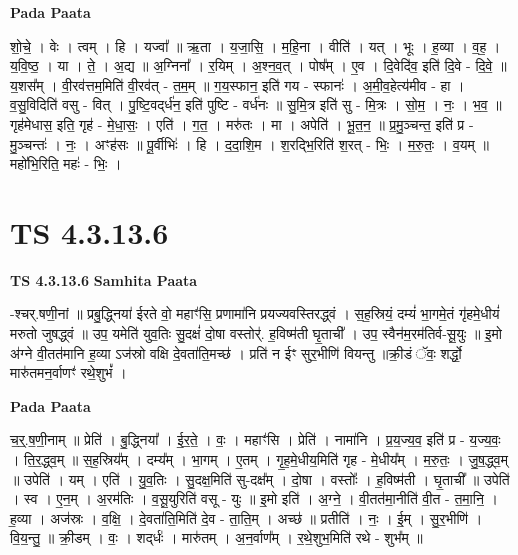 \documentclass[17pt]{extarticle}
\begin{document}
\textbf{Pada Paata} \newline

शो॒चे॒ । वेः । त्वम् । हि । यज्वा᳚ ॥ ऋ॒ता । य॒जा॒सि॒ । म॒हि॒ना । वीति॑ । यत् । भूः । ह॒व्या । व॒ह॒ । य॒वि॒ष्ठ॒ । या । ते॒ । अ॒द्य ॥ अ॒ग्निना᳚ । र॒यिम् । अ॒श्न॒व॒त् । पोष᳚म् । ए॒व । दि॒वेदि॑व॒ इति॑ दि॒वे - दि॒वे॒ ॥ य॒शस᳚म् । वी॒रव॑त्तम॒मिति॑ वी॒रव॑त् - त॒म॒म् ॥ ग॒य॒स्फान॒ इति॑ गय - स्फानः॑ । अ॒मी॒व॒हेत्य॑मीव - हा । व॒सु॒विदिति॑ वसु - वित् । पु॒ष्टि॒वद्‌र्ध॑न॒ इति॑ पुष्टि - वर्ध॑नः ॥ सु॒मि॒त्र इति॑ सु - मि॒त्रः । सो॒म॒ । नः॒ । भ॒व॒ ॥ गृह॑मेधास॒ इति॒ गृह॑ - मे॒धा॒सः॒ । एति॑ । ग॒त॒ । मरु॑तः । मा । अपेति॑ । भू॒त॒न॒ ॥ प्र॒मु॒ञ्चन्त॒ इति॑ प्र - मु॒ञ्चन्तः॑ । नः॒ । अꣳह॑सः ॥ पू॒र्वीभिः॑ । हि । द॒दा॒शि॒म । श॒रद्भि॒रिति॑ श॒रत् - भिः॒ । म॒रु॒तः॒ । व॒यम् ॥ महो॑भि॒रिति॒ महः॑ - भिः॒ ।  \newline





\section{ TS 4.3.13.6 }

\textbf{TS 4.3.13.6 } \newline
\textbf{Samhita Paata} \newline

-श्चर्.षणी॒नां ॥ प्रबु॒द्ध्निया॑ ईरते वो॒ महाꣳ॑सि॒ प्रणामा॑नि प्रयज्यवस्तिरद्ध्वं । स॒ह॒स्रियं॒ दम्यं॑ भा॒गमे॒तं गृ॑हमे॒धीयं॑ मरुतो जुषद्ध्वं ॥ उप॒ यमेति॑ युव॒तिः सु॒दक्षं॑ दो॒षा वस्तोर्॑. ह॒विष्म॑ती घृ॒ताची᳚ । उप॒ स्वैन॑म॒रम॑तिर्व-सू॒युः ॥ इ॒मो अ॑ग्ने वी॒तत॑मानि ह॒व्या ऽज॑स्रो वक्षि दे॒वता॑ति॒मच्छ॑ । प्रति॑ न ईꣳ सुर॒भीणि॑ वियन्तु ॥क्री॒डं ॅवः॒ शर्द्धो॒ मारु॑तमन॒र्वाणꣳ॑ रथे॒शुभं᳚ । \newline

\textbf{Pada Paata} \newline

च॒र्॒.ष॒णी॒नाम् ॥ प्रेति॑ । बु॒द्ध्निया᳚ । ई॒र॒ते॒ । वः॒ । महाꣳ॑सि । प्रेति॑ । नामा॑नि । प्र॒य॒ज्य॒व॒ इति॑ प्र - य॒ज्य॒वः॒ । ति॒र॒द्ध्व॒म् ॥ स॒ह॒स्रिय᳚म् । दम्य᳚म् । भा॒गम् । ए॒तम् । गृ॒ह॒मे॒धीय॒मिति॑ गृह - मे॒धीय᳚म् । म॒रु॒तः॒ । जु॒ष॒द्ध्व॒म् ॥ उपेति॑ । यम् । एति॑ । यु॒व॒तिः । सु॒दक्ष॒मिति॑ सु-दक्ष᳚म् । दो॒षा । वस्तोः᳚ । ह॒विष्म॑ती । घृ॒ताची᳚ ॥ उपेति॑ । स्व । ए॒न॒म् । अ॒रम॑तिः । व॒सू॒युरिति॑ वसू - युः ॥ इ॒मो इति॑ । अ॒ग्ने॒ । वी॒तत॑मा॒नीति॑ वी॒त - त॒मा॒नि॒ । ह॒व्या । अज॑स्रः । व॒क्षि॒ । दे॒वता॑ति॒मिति॑ दे॒व - ता॒ति॒म् । अच्छ॑ ॥ प्रतीति॑ । नः॒ । ई॒म् । सु॒र॒भीणि॑ । वि॒य॒न्तु॒ ॥ क्री॒डम् । वः॒ । शद्‌र्धः॑ । मारु॑तम् । अ॒न॒र्वाण᳚म् । र॒थे॒शुभ॒मिति॑ रथे - शुभ᳚म् ॥  \newline
\end{document}
